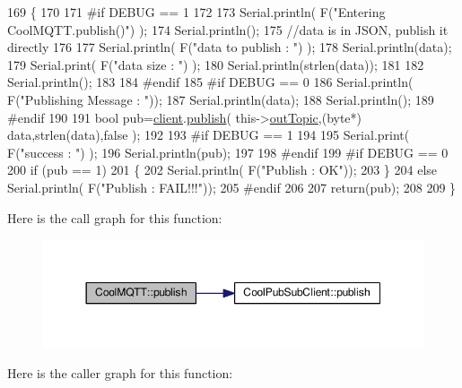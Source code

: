 \begin{DoxyCode}
169 \{
170 
171 \textcolor{preprocessor}{#if DEBUG == 1 }
172 
173     Serial.println( F(\textcolor{stringliteral}{"Entering CoolMQTT.publish()"}) );
174     Serial.println();
175     \textcolor{comment}{//data is in JSON, publish it directly}
176 
177     Serial.println( F(\textcolor{stringliteral}{"data to publish : "}) );
178     Serial.println(data);
179     Serial.print( F(\textcolor{stringliteral}{"data size : "}) );
180     Serial.println(strlen(data));
181 
182     Serial.println();
183 
184 \textcolor{preprocessor}{#endif}
185 \textcolor{preprocessor}{#if DEBUG == 0}
186     Serial.println( F(\textcolor{stringliteral}{"Publishing Message : "}));
187     Serial.println(data);
188     Serial.println();
189 \textcolor{preprocessor}{#endif}
190 
191     \textcolor{keywordtype}{bool} pub=\hyperlink{class_cool_m_q_t_t_afed1372683c44893b4668d0f1771f514}{client}.\hyperlink{class_cool_pub_sub_client_ab6ad5fa2d3db8f91454027257f225a89}{publish}( this->\hyperlink{class_cool_m_q_t_t_a109c786a17b463f9eeba046194279522}{outTopic},(byte*) data,strlen(data),\textcolor{keyword}{false}  );
192 
193 \textcolor{preprocessor}{#if DEBUG == 1 }
194 
195     Serial.print( F(\textcolor{stringliteral}{"success : "}) );
196     Serial.println(pub);    
197 
198 \textcolor{preprocessor}{#endif}
199 \textcolor{preprocessor}{#if DEBUG == 0}
200     \textcolor{keywordflow}{if} (pub == 1)
201     \{
202         Serial.println( F(\textcolor{stringliteral}{"Publish : OK"}));
203     \}
204     \textcolor{keywordflow}{else} Serial.println( F(\textcolor{stringliteral}{"Publish : FAIL!!!"}));
205 \textcolor{preprocessor}{#endif}
206 
207     \textcolor{keywordflow}{return}(pub);
208 
209 \}
\end{DoxyCode}
Here is the call graph for this function\+:\nopagebreak
\begin{figure}[H]
\begin{center}
\leavevmode
\includegraphics[width=350pt]{d0/dd0/class_cool_m_q_t_t_ace977b3e90ab14b1199fe5c4fb0a13ec_cgraph}
\end{center}
\end{figure}
Here is the caller graph for this function\+:\nopagebreak
